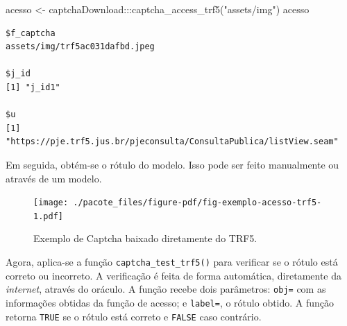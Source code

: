 \documentclass[12pt,twoside,brazilian]{book}
\newenvironment{Shaded}{\begin{snugshade}}{\end{snugshade}}
\newcommand{\AlertTok}[1]{\textcolor[rgb]{0.68,0.00,0.00}{#1}}
\newcommand{\CommentTok}[1]{\textcolor[rgb]{0.37,0.37,0.37}{#1}}
\newcommand{\FunctionTok}[1]{\textcolor[rgb]{0.28,0.35,0.67}{#1}}
\newcommand{\NormalTok}[1]{\textcolor[rgb]{0.00,0.23,0.31}{#1}}
\newcommand{\OtherTok}[1]{\textcolor[rgb]{0.00,0.23,0.31}{#1}}
\newcommand{\SpecialCharTok}[1]{\textcolor[rgb]{0.37,0.37,0.37}{#1}}
\newcommand{\StringTok}[1]{\textcolor[rgb]{0.13,0.47,0.30}{#1}}
\begin{document}
\begin{Shaded}
\begin{Highlighting}[]
\NormalTok{acesso }\OtherTok{\textless{}{-}}\NormalTok{ captchaDownload}\SpecialCharTok{:::}\FunctionTok{captcha\_access\_trf5}\NormalTok{(}\StringTok{"assets/img"}\NormalTok{)}
\NormalTok{acesso}
\end{Highlighting}
\end{Shaded}

\begin{verbatim}
$f_captcha
assets/img/trf5ac031dafbd.jpeg

$j_id
[1] "j_id1"

$u
[1] "https://pje.trf5.jus.br/pjeconsulta/ConsultaPublica/listView.seam"
\end{verbatim}

Em seguida, obtém-se o rótulo do modelo. Isso pode ser feito manualmente
ou através de um modelo.

\begin{Shaded}
\end{Shaded}

\begin{figure}[H]

{\centering \texttt{[image: ./pacote\_files/figure-pdf/fig-exemplo-acesso-trf5-1.pdf]}

}

\caption{\label{fig-exemplo-acesso-trf5}Exemplo de Captcha baixado
diretamente do TRF5.}

\end{figure}

Agora, aplica-se a função \texttt{captcha\_test\_trf5()} para verificar
se o rótulo está correto ou incorreto. A verificação é feita de forma
automática, diretamente da \emph{internet}, através do oráculo. A função
recebe dois parâmetros: \texttt{obj=} com as informações obtidas da
função de acesso; e \texttt{label=}, o rótulo obtido. A função retorna
\texttt{TRUE} se o rótulo está correto e \texttt{FALSE} caso contrário.
\end{document}
